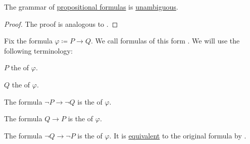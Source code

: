 \begin{proposition}\label{thm:propositional_formulas_are_unambiguous}
  The grammar of \hyperref[def:propositional_language/formula]{propositional formulas} is \hyperref[def:grammar_derivation/ambiguity]{unambiguous}.
\end{proposition}
\begin{proof}
  The proof is analogous to .
\end{proof}

\begin{definition}\label{def:material_implication}
  Fix the formula \( \varphi \coloneqq P \rightarrow Q \). We call formulas of this form . We will use the following terminology:

  \begin{DefEnum}
     \( P \) the  of \( \varphi \).

     \( Q \) the  of \( \varphi \).

     The formula \( \neg P \rightarrow \neg Q \) is the  of \( \varphi \).

     The formula \( Q \rightarrow P \) is the  of \( \varphi \).

     The formula \( \neg Q \rightarrow \neg P \) is the  of \( \varphi \). It is \hyperref[def:propositional_interpretation/equivalence]{equivalent} to the original formula by .
  \end{DefEnum}
\end{definition}

